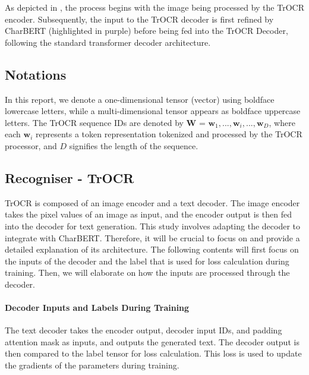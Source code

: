 As depicted in , the process begins with the image being processed by the TrOCR encoder. Subsequently, the input to the TrOCR decoder is first refined by CharBERT (highlighted in purple) before being fed into the TrOCR Decoder, following the standard transformer decoder architecture.


\subsection{Notations}
\label{subsec:3_Notations}
In this report, we denote a one-dimensional tensor (vector) using boldface lowercase letters, while a multi-dimensional tensor appears as boldface uppercase letters. The TrOCR sequence IDs are denoted by $\mathbf{W}$ = {$\mathbf{w}_1, ..., \mathbf{w}_i, ..., \mathbf{w}_D$}, where each $\mathbf{w}_i$ represents a token representation tokenized and processed by the TrOCR processor, and $D$ signifies the length of the sequence.

\subsection{Recogniser - TrOCR}
\label{subsec:3_recogniser_trocr}
TrOCR is composed of an image encoder and a text decoder. The image encoder takes the pixel values of an image as input, and the encoder output is then fed into the decoder for text generation. This study involves adapting the decoder to integrate with CharBERT. Therefore, it will be crucial to focus on and provide a detailed explanation of its architecture. The following contents will first focus on the inputs of the decoder and the label that is used for loss calculation during training. Then, we will elaborate on how the inputs are processed through the decoder.

\paragraph*{Decoder Inputs and Labels During Training}
\label{par:3_decoder_inputs_and_labels}
The text decoder takes the encoder output, decoder input IDs, and padding attention mask as inputs, and outputs the generated text. The decoder output is then compared to the label tensor for loss calculation. This loss is used to update the gradients of the parameters during training.

